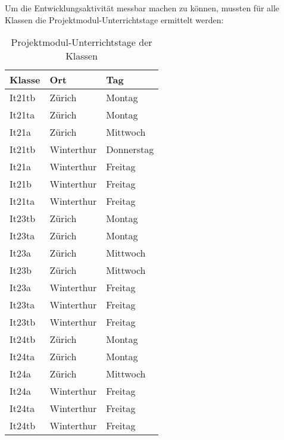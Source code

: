 Um die Entwicklungsaktivität messbar machen zu können, mussten für alle Klassen die Projektmodul-Unterrichtstage ermittelt werden:
\begin{table}[ht]
\caption{Projektmodul-Unterrichtstage der Klassen}
\label{tab:stundenplan}
\centering
\begin{tabular}{l l l}
\toprule
\textbf{Klasse} & \textbf{Ort} & \textbf{Tag} \\
\midrule
It21tb   & Zürich      & Montag      \\
It21ta   & Zürich      & Montag      \\
It21a    & Zürich      & Mittwoch    \\
It21tb   & Winterthur  & Donnerstag  \\
It21a    & Winterthur  & Freitag     \\
It21b    & Winterthur  & Freitag     \\
It21ta   & Winterthur  & Freitag     \\
\midrule
It23tb   & Zürich      & Montag      \\
It23ta   & Zürich      & Montag      \\
It23a    & Zürich      & Mittwoch    \\
It23b    & Zürich      & Mittwoch    \\
It23a    & Winterthur  & Freitag     \\
It23ta   & Winterthur  & Freitag     \\
It23tb   & Winterthur  & Freitag     \\
\midrule
It24tb   & Zürich      & Montag      \\
It24ta   & Zürich      & Montag      \\
It24a    & Zürich      & Mittwoch    \\
It24a    & Winterthur  & Freitag     \\
It24ta   & Winterthur  & Freitag     \\
It24tb   & Winterthur  & Freitag     \\
\bottomrule
\end{tabular}
\end{table}

